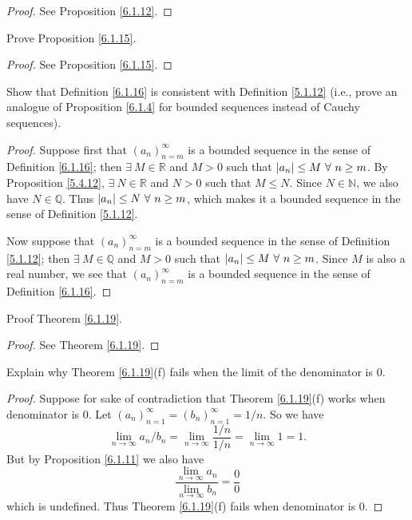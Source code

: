 \begin{proof}
See Proposition \ref{6.1.12}.
\end{proof}

\begin{exercise}\label{ex 6.1.6}
Prove Proposition \ref{6.1.15}.
\end{exercise}

\begin{proof}
See Proposition \ref{6.1.15}.
\end{proof}

\begin{exercise}\label{ex 6.1.7}
Show that Definition \ref{6.1.16} is consistent with Definition \ref{5.1.12}
(i.e., prove an analogue of Proposition \ref{6.1.4} for bounded sequences instead of Cauchy sequences).
\end{exercise}

\begin{proof}
Suppose first that \((a_n)_{n = m}^\infty\) is a bounded sequence in the sense of Definition \ref{6.1.16};
then \(\exists\ M \in \mathds{R}\) and \(M > 0\) such that \(\abs*{a_n} \leq M \ \forall\ n \geq m\).
By Proposition \ref{5.4.12}, \(\exists\ N \in \mathds{R}\) and \(N > 0\) such that \(M \leq N\).
Since \(N \in \mathds{N}\), we also have \(N \in \mathds{Q}\).
Thus \(\abs*{a_n} \leq N \ \forall\ n \geq m\), which makes it a bounded sequence in the sense of Definition \ref{5.1.12}.

Now suppose that \((a_n)_{n = m}^\infty\) is a bounded sequence in the sense of Definition \ref{5.1.12};
then \(\exists\ M \in \mathds{Q}\) and \(M > 0\) such that \(\abs*{a_n} \leq M \ \forall\ n \geq m\).
Since \(M\) is also a real number, we see that \((a_n)_{n = m}^\infty\) is a bounded sequence in the sense of Definition \ref{6.1.16}.
\end{proof}

\begin{exercise}\label{ex 6.1.8}
Proof Theorem \ref{6.1.19}.
\end{exercise}

\begin{proof}
See Theorem \ref{6.1.19}.
\end{proof}

\begin{exercise}\label{ex 6.1.9}
Explain why Theorem \ref{6.1.19}(f) fails when the limit of the denominator is \(0\).
\end{exercise}

\begin{proof}
Suppose for sake of contradiction that Theorem \ref{6.1.19}(f) works when denominator is \(0\).
Let \((a_n)_{n = 1}^\infty = (b_n)_{n = 1}^\infty = 1 / n\).
So we have
\[
    \lim_{n \to \infty} a_n / b_n = \lim_{n \to \infty} \frac{1 / n}{1 / n} = \lim_{n \to \infty} 1 = 1.
\]
But by Proposition \ref{6.1.11} we also have
\[
    \frac{\lim_{n \to \infty} a_n}{\lim_{n \to \infty} b_n} = \frac{0}{0}
\]
which is undefined.
Thus Theorem \ref{6.1.19}(f) fails when denominator is \(0\).
\end{proof}